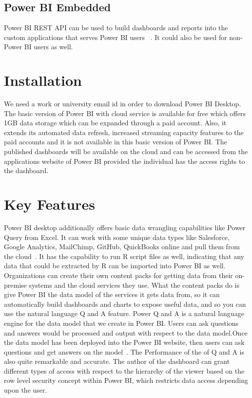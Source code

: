 \subsection{Power BI Embedded}
Power BI REST API can be used to build dashboards and 
reports into the custom applications that serves Power BI users
~\cite{hid-sp18-418-powerbi-components}. It could also be used for non-Power 
BI users as well.

\section{Installation}
We need a work or university email id in order to download Power BI Desktop. The basic 
version of Power BI with cloud service is available for free which offers 
1GB data storage which can be expanded through a paid account. Also, it extends
its automated data refresh, increased streaming capacity features to the paid 
accounts and it is not available in this basic version of Power BI\@. 
The published dashboards will be available on the cloud and can be accessed from 
the applications website of Power BI provided the individual has the access rights to the 
dashboard.
 
\section{Key Features}
Power BI desktop additionally offers basic data wrangling capabilities like Power Query 
from Excel. It can work with some unique data types like Salesforce, Google Analytics, 
MailChimp, GitHub, QuickBooks online and pull them from the cloud~\cite{hid-sp18-418-powerbi-intro}.
It has the capability to run R script files as well, indicating that any data 
that could be extracted by R can be imported into Power BI as well. 
Organizations can create their own content packs for getting data from their 
on-premise systems and the cloud services they use. What the content packs do 
is give Power BI the data model of the services it gets data from, so it can 
automatically build dashboards and charts to expose useful data, and so you 
can use the natural language Q and A feature. Power Q and A  is a natural language 
engine for the data model that we create in Power BI\@. Users can ask questions 
and answers would be processed and output with respect to the data model.Once 
the data model has been deployed into the Power BI website, then users can ask 
questions and get answers on the model~\cite{hid-sp18-418-powerbi-intro}. The 
Performance of the of Q and A is also quite remarkable and accurate.
The author of the dashboard can grant different types of access with respect 
to the hierarchy of the viewer based on the row level security concept within 
Power BI, which restricts data access depending upon the user.


